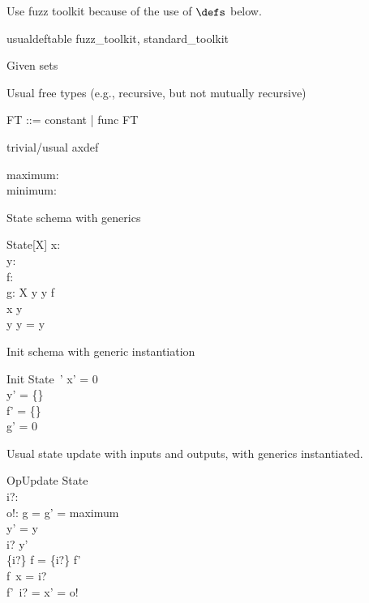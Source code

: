 \documentclass{article}
\begin{document}
Use fuzz toolkit because of the use of $\defs$ below.
%
\begin{zsection}
\SECTION usualdeftable \parents fuzz\_toolkit, standard\_toolkit
\end{zsection}

Given sets
\begin{zed}
   [G]
\end{zed}

Usual free types (e.g., recursive, but not mutually recursive)
\begin{zed}
   FT ::= constant | func \ldata \nat \cross FT \rdata
\end{zed}

trivial/usual axdef
\begin{axdef}
   maximum: \nat \\
   minimum: \nat
\end{axdef}

State schema with generics
\begin{schema}{State}[X]
   x: \nat \\
   y: \power~\nat \\
   f: \nat \pfun \nat \\
   g: X
\where
   y \cross y \subseteq f \\
   x \in y \\ 
   y \cap y = y
\end{schema}

Init schema with generic instantiation
\begin{schema}{Init}
   State~'
\where
   x' = 0 \\
   y' = \{\} \\
   f' = \{\} \\
   g' = 0
\end{schema}

Usual state update with inputs and outputs, with generics instantiated.
\begin{schema}{OpUpdate}
   \Delta State \\
   i?: \nat \\
   o!: \nat
\where
   g = g' = maximum \\ %
   y' = y \\
   i? \in y' \\
   \{i?\} \dres f = \{i?\} \dres f' \\ %
   f~x = i? \\
   f'~i? = x' = o!
\end{schema}
\end{document}
